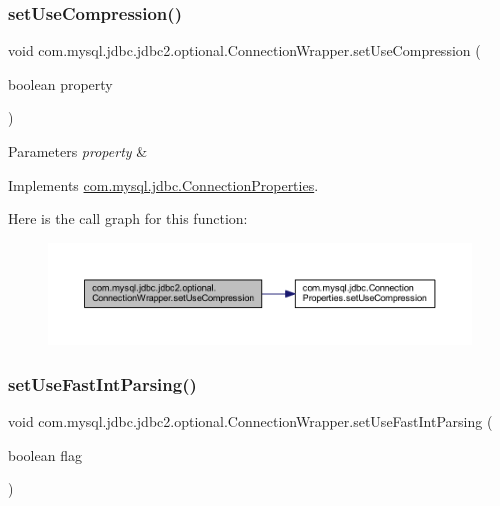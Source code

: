 \subsubsection{\texorpdfstring{set\+Use\+Compression()}{setUseCompression()}}
{\footnotesize\ttfamily void com.\+mysql.\+jdbc.\+jdbc2.\+optional.\+Connection\+Wrapper.\+set\+Use\+Compression (\begin{DoxyParamCaption}\item[{boolean}]{property }\end{DoxyParamCaption})}


\begin{DoxyParams}{Parameters}
{\em property} & \\
\hline
\end{DoxyParams}


Implements \mbox{\hyperlink{interfacecom_1_1mysql_1_1jdbc_1_1_connection_properties_a60f864890c4947c6a45fb0d99cc7c78d}{com.\+mysql.\+jdbc.\+Connection\+Properties}}.

Here is the call graph for this function\+:
\nopagebreak
\begin{figure}[H]
\begin{center}
\leavevmode
\includegraphics[width=350pt]{classcom_1_1mysql_1_1jdbc_1_1jdbc2_1_1optional_1_1_connection_wrapper_a23ee905e6cb31af58b1cfc66edbd2050_cgraph}
\end{center}
\end{figure}
\mbox{\label{classcom_1_1mysql_1_1jdbc_1_1jdbc2_1_1optional_1_1_connection_wrapper_af424c555856eefbd0cad9ad2ffa0bf46}} 
\subsubsection{\texorpdfstring{set\+Use\+Fast\+Int\+Parsing()}{setUseFastIntParsing()}}
{\footnotesize\ttfamily void com.\+mysql.\+jdbc.\+jdbc2.\+optional.\+Connection\+Wrapper.\+set\+Use\+Fast\+Int\+Parsing (\begin{DoxyParamCaption}\item[{boolean}]{flag }\end{DoxyParamCaption})}


